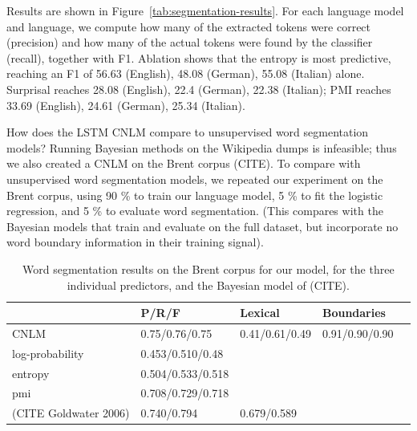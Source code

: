 

Results are shown in Figure~\ref{tab:segmentation-results}.
For each language model and language, we compute how many of the extracted tokens were correct (precision) and how many of the actual tokens were found by the classifier (recall), together with F1.
Ablation shows that the entropy is most predictive, reaching an F1 of 56.63 (English), 48.08 (German), 55.08 (Italian) alone.
Surprisal reaches 28.08 (English), 22.4 (German), 22.38 (Italian); PMI reaches 33.69 (English), 24.61 (German), 25.34 (Italian).

How does the LSTM CNLM compare to unsupervised word segmentation models?
Running Bayesian methods on the Wikipedia dumps is infeasible; thus we also created a CNLM on the Brent corpus (CITE).
To compare with unsupervised word segmentation models, we repeated our experiment on the Brent corpus, using 90 \% to train our language model, 5 \% to fit the logistic regression, and 5 \% to evaluate word segmentation.
(This compares with the Bayesian models that train and evaluate on the full dataset, but incorporate no word boundary information in their training signal).

\begin{table}[t]
  \begin{center}
    \begin{tabular}{l|l|l|l|l}
      \multicolumn{1}{c}{}&P/R/F & Lexical & Boundaries\\      \hline
      CNLM & 0.75/0.76/0.75 & 0.41/0.61/0.49 & 0.91/0.90/0.90 \\
     log-probability & 0.453/0.510/0.48 \\
     entropy & 0.504/0.533/0.518 \\
     pmi & 0.708/0.729/0.718 \\ \hline
	    (CITE Goldwater 2006) & 0.740/0.794 & 0.679/0.589
    \end{tabular}
  \end{center}
	\caption{\label{tab:segmentation-results-brent} Word segmentation results on the Brent corpus for our model, for the three individual predictors, and the Bayesian model of (CITE).}
\end{table}


